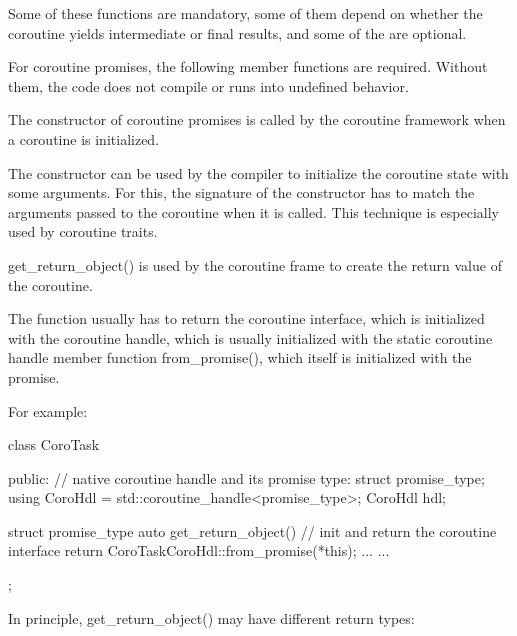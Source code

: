 Some of these functions are mandatory, some of them depend on whether the coroutine yields intermediate or final results, and some of the are optional.


For coroutine promises, the following member functions are required. Without them, the code does not compile or runs into undefined behavior.


The constructor of coroutine promises is called by the coroutine framework when a coroutine is initialized.

The constructor can be used by the compiler to initialize the coroutine state with some arguments. For this, the signature of the constructor has to match the arguments passed to the coroutine when it is called. This technique is especially used by coroutine traits.


get\_return\_object() is used by the coroutine frame to create the return value of the coroutine.

The function usually has to return the coroutine interface, which is initialized with the coroutine handle, which is usually initialized with the static coroutine handle member function from\_promise(), which itself is initialized with the promise.

For example:

\begin{cpp}
class CoroTask {
	public:
	// native coroutine handle and its promise type:
	struct promise_type;
	using CoroHdl = std::coroutine_handle<promise_type>;
	CoroHdl hdl;
	
	struct promise_type {
		auto get_return_object() { // init and return the coroutine interface
			return CoroTask{CoroHdl::from_promise(*this)};
		}
		...
	}
	...
};
\end{cpp}

In principle, get\_return\_object() may have different return types:

